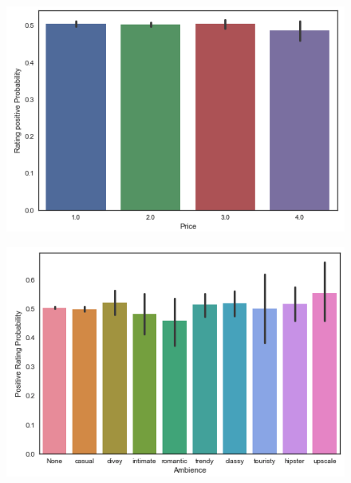 \documentclass{article}
\begin{document}
\begin{figure}[t]
\centering
\begin{minipage}{.5\textwidth}
  \centering
  \includegraphics[width=\linewidth]{Price.png}
  \label{fig:test1}
\end{minipage}%
\begin{minipage}{.5\textwidth}
  \centering
  \includegraphics[width=\linewidth]{Ambience.png}
  \label{fig:test2}
\end{minipage}
\end{figure}
\end{document}
